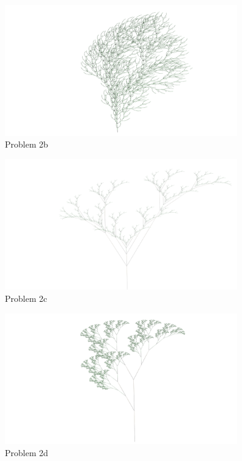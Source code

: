 \begin{figure}[H]
\centering
\noindent\includegraphics[width=0.90\textwidth]{figures/L-systems/b}
\caption{Problem 2b}
\label{fig:prob2b}
\end{figure}

\begin{figure}[H]
\centering
\noindent\includegraphics[width=0.90\textwidth]{figures/L-systems/c}
\caption{Problem 2c}
\label{fig:prob2c}
\end{figure}

\begin{figure}[H]
\centering
\noindent\includegraphics[width=0.90\textwidth]{figures/L-systems/d}
\caption{Problem 2d}
\label{fig:prob2d}
\end{figure}

